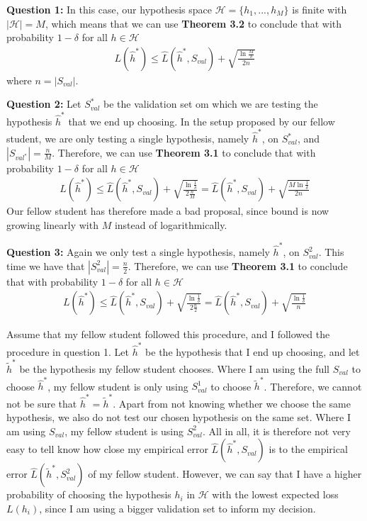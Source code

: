 \textbf{Question 1:} In this case, our hypothesis space $\mathcal{H} = \{h_1,...,h_M \}$ is finite with $|\mathcal{H}| = M$, which means that we can use \textbf{Theorem 3.2} to conclude that with probability $1 - \delta$ for all $h \in \mathcal{H}$
\begin{align}
L(\hat{h}^*) \leq \hat{L}(\hat{h}^*, S_{val}) + \sqrt{\frac{\ln \frac{M}{\delta}}{2n}}
\end{align}
where $n=|S_{val}|$.

\textbf{Question 2:} Let $S_{val}^*$ be the validation set om which we are testing the hypothesis $\hat{h}^*$ that we end up choosing. In the setup proposed by our fellow student, we are only testing a single hypothesis, namely $\hat{h}^*$, on $S_{val}^*$, and $|S_{val^*}|=\frac{n}{M}$. Therefore, we can use \textbf{Theorem 3.1} to conclude that with probability $1 - \delta$ for all $h \in \mathcal{H}$
\begin{align}
L(\hat{h}^*) \leq \hat{L}(\hat{h}^*, S_{val}) + \sqrt{\frac{\ln \frac{1}{\delta}}{2\frac{n}{M}}} = \hat{L}(\hat{h}^*, S_{val}) + \sqrt{\frac{ M \ln \frac{1}{\delta}}{2n}}
\end{align}
Our fellow student has therefore made a bad proposal, since bound is now growing linearly with $M$ instead of logarithmically.

\textbf{Question 3:} Again we only test a single hypothesis, namely $\hat{h}^*$, on $S_{val}^2$. This time we have that $|S_{val}^2|=\frac{n}{2}$. Therefore, we can use \textbf{Theorem 3.1} to conclude that with probability $1 - \delta$ for all $h \in \mathcal{H}$
\begin{align}
L(\hat{h}^*) \leq \hat{L}(\hat{h}^*, S_{val}) + \sqrt{\frac{\ln \frac{1}{\delta}}{2\frac{n}{2}}} = \hat{L}(\hat{h}^*, S_{val}) + \sqrt{\frac{ \ln \frac{1}{\delta}}{n}}
\end{align}

Assume that my fellow student followed this procedure, and I followed the procedure in question 1. Let $\hat{h}^*$ be the hypothesis that I end up choosing, and let $\tilde{h}^*$ be the hypothesis my fellow student chooses. Where I am using the full $S_{val}$ to choose $\hat{h}^*$, my fellow student is only using $S^1_{val}$ to choose $\tilde{h}^*$. Therefore, we cannot not be sure that $\hat{h}^* = \tilde{h}^*$. Apart from not knowing whether we choose the same hypothesis, we also do not test our chosen hypothesis on the same set. Where I am using $S_{val}$, my fellow student is using $S_{val}^2$. All in all, it is therefore not very easy to tell know how close my empirical error $\hat{L}(\hat{h}^*,S_{val})$ is to the empirical error $\hat{L}(\tilde{h}^*,S_{val}^2)$ of my fellow student. However, we can say that I have a higher probability of choosing the hypothesis $h_i$ in $\mathcal{H}$ with the lowest expected loss $L(h_i)$, since I am using a bigger validation set to inform my decision.


